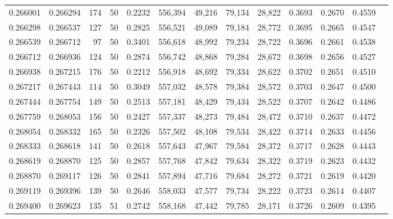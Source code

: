 \begin{tabular}{rrrrrrrrrrrrr}
0.266001 & 0.266294 &   174 &  50 &                                     0.2232 & 556,394 &  49,216 &  79,134 &  28,822 & 0.3693 & 0.2670 & 0.4559 \\
0.266298 & 0.266537 &   127 &  50 &                                     0.2825 & 556,521 &  49,089 &  79,184 &  28,772 & 0.3695 & 0.2665 & 0.4547 \\
0.266539 & 0.266712 &    97 &  50 &                                     0.3401 & 556,618 &  48,992 &  79,234 &  28,722 & 0.3696 & 0.2661 & 0.4538 \\
0.266712 & 0.266936 &   124 &  50 &                                     0.2874 & 556,742 &  48,868 &  79,284 &  28,672 & 0.3698 & 0.2656 & 0.4527 \\
0.266938 & 0.267215 &   176 &  50 &                                     0.2212 & 556,918 &  48,692 &  79,334 &  28,622 & 0.3702 & 0.2651 & 0.4510 \\
0.267217 & 0.267443 &   114 &  50 &                                     0.3049 & 557,032 &  48,578 &  79,384 &  28,572 & 0.3703 & 0.2647 & 0.4500 \\
0.267444 & 0.267754 &   149 &  50 &                                     0.2513 & 557,181 &  48,429 &  79,434 &  28,522 & 0.3707 & 0.2642 & 0.4486 \\
0.267759 & 0.268053 &   156 &  50 &                                     0.2427 & 557,337 &  48,273 &  79,484 &  28,472 & 0.3710 & 0.2637 & 0.4472 \\
0.268054 & 0.268332 &   165 &  50 &                                     0.2326 & 557,502 &  48,108 &  79,534 &  28,422 & 0.3714 & 0.2633 & 0.4456 \\
0.268333 & 0.268618 &   141 &  50 &                                     0.2618 & 557,643 &  47,967 &  79,584 &  28,372 & 0.3717 & 0.2628 & 0.4443 \\
0.268619 & 0.268870 &   125 &  50 &                                     0.2857 & 557,768 &  47,842 &  79,634 &  28,322 & 0.3719 & 0.2623 & 0.4432 \\
0.268870 & 0.269117 &   126 &  50 &                                     0.2841 & 557,894 &  47,716 &  79,684 &  28,272 & 0.3721 & 0.2619 & 0.4420 \\
0.269119 & 0.269396 &   139 &  50 &                                     0.2646 & 558,033 &  47,577 &  79,734 &  28,222 & 0.3723 & 0.2614 & 0.4407 \\
0.269400 & 0.269623 &   135 &  51 &                                     0.2742 & 558,168 &  47,442 &  79,785 &  28,171 & 0.3726 & 0.2609 & 0.4395 \\

\end{tabular}
